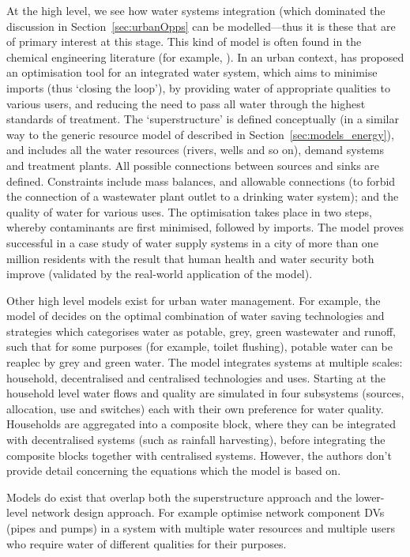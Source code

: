 At the high level, we see how water systems integration (which dominated the discussion in Section~\ref{sec:urbanOpps} can be modelled---thus it is these that are of primary interest at this stage. This kind of model is often found in the chemical engineering literature (for example, \citet{Khor2012}). In an urban context, \citet{Lim2010} has proposed an optimisation tool for an integrated water system, which aims to minimise imports (thus `closing the loop'), by providing water of appropriate qualities to various users, and reducing the need to pass all water through the highest standards of treatment. The `superstructure' is defined conceptually (in a similar way to the generic resource model of \citet{Samsatli} described in Section~\ref{sec:models_energy}), and includes all the water resources (rivers, wells and so on), demand systems and treatment plants. All possible connections between sources and sinks are defined. Constraints include mass balances, and allowable connections (to forbid the connection of a wastewater plant outlet to a drinking water system); and the quality of water for various uses. The optimisation takes place in two steps, whereby contaminants are first minimised, followed by imports. The model proves successful in a case study of water supply systems in a city of more than one million residents with the result that human health and water security both improve (validated by the real-world application of the model).

Other high level models exist for urban water management. For example, the model of \citet{Makropoulos2008} decides on the optimal combination of water saving technologies and strategies which categorises water as potable, grey, green wastewater and runoff, such that for some purposes (for example, toilet flushing), potable water can be reaplec by grey and green water. The model integrates systems at multiple scales: household, decentralised and centralised technologies and uses. Starting at the household level water flows and quality are simulated in four subsystems (sources, allocation, use and switches) each with their own preference for water quality. Households are aggregated into a composite block, where they can be integrated with decentralised systems (such as rainfall harvesting), before integrating the composite blocks together with centralised systems. However, the authors don't provide detail concerning the equations which the model is based on.

Models do exist that overlap both the superstructure approach and the lower-level network design approach. For example \citet{Chung2008} optimise network component DVs (pipes and pumps) in a system with multiple water resources and multiple users who require water of different qualities for their purposes.

